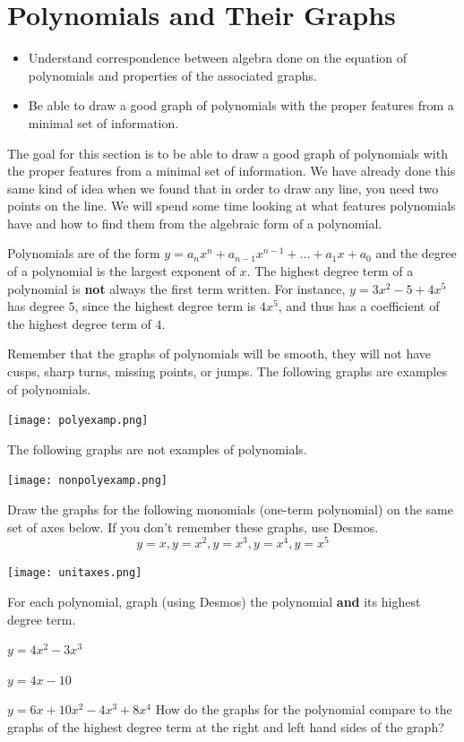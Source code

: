 \section{Polynomials and Their Graphs}
\begin{itemize}
  \item Understand correspondence between algebra done on the equation of polynomials and properties of the associated graphs.
  \item Be able to draw a good graph of polynomials with the proper features from a minimal set of information.
\end{itemize}
The goal for this section is to be able to draw a good graph of polynomials with the proper features from a minimal set of information. We have already done this same kind of idea when we found that in order to draw any line, you need two points on the line.
We will spend some time looking at what features polynomials have and how to find them from the algebraic form of a polynomial.

Polynomials are of the form $y=a_n x^n+a_{n-1} x^{n-1}+ ...+a_1 x+a_0$ and the degree of a polynomial is the largest exponent of $x$. The highest degree term of a polynomial is \textbf{not} always the first term written. For instance, $y=3x^2-5+4x^5$ has degree $5$, since the highest degree term is $4x^5$, and thus has a coefficient of the highest degree term of $4$.

Remember that the graphs of polynomials will be smooth, they will not have cusps, sharp turns, missing points, or jumps. The following graphs are examples of polynomials.

\begin{center} \texttt{[image: polyexamp.png]} \end{center}

The following graphs are not examples of polynomials.

\begin{center} \texttt{[image: nonpolyexamp.png]} \end{center}


\bq Draw the graphs for the following monomials (one-term polynomial) on the same set of axes below. If you don't remember these graphs, use Desmos.
$$ y=x, y=x^2, y=x^3, y=x^4, y=x^5$$

\begin{center} \texttt{[image: unitaxes.png]} \end{center}

\eq

\bq For each polynomial, graph (using Desmos) the polynomial \textbf{and} its highest degree term.
\be
\item $y=4x^2-3x^3$
\item $y=4x-10$
\item $y=6x+10x^2-4x^3+8x^4$
\ee
How do the graphs for the polynomial compare to the graphs of the highest degree term at the right and left hand sides of the graph?
\eq


